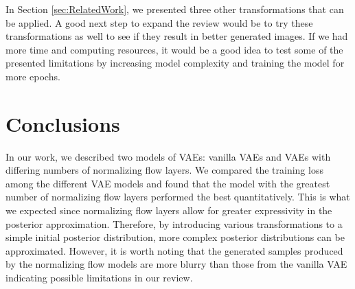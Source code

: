 \documentclass{article}
\begin{document}
In Section \ref{sec:RelatedWork}, we presented three other transformations that can be applied. 
A good next step to expand the review would be to try these transformations as well to see if they 
result in better generated images. If we had more time and computing resources, it would be a good 
idea to test some of the presented limitations by increasing model complexity and training the model 
for more epochs.

\section{Conclusions}
In our work, we described two models of VAEs: vanilla VAEs and VAEs with differing numbers of
normalizing flow layers.  We compared the training loss among the different VAE models and found
that the model with the greatest number of normalizing flow layers performed the best quantitatively.  
This is what we expected since normalizing flow layers allow for greater expressivity in the posterior 
approximation. Therefore, by introducing various transformations to a simple initial posterior distribution, 
more complex posterior distributions can be approximated. However, it is worth noting that the generated 
samples produced by the normalizing flow models are more blurry than those from the vanilla VAE 
indicating possible limitations in our review.


\small
%


\end{document}
